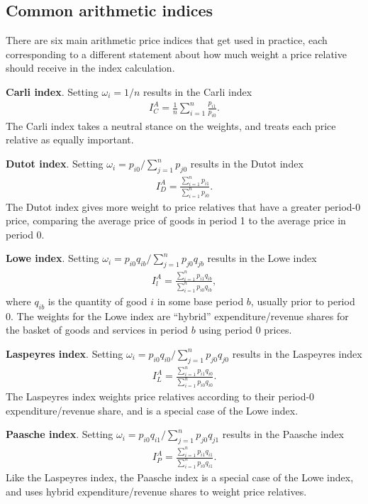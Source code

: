 \documentclass[]{article}
\begin{document}
\hypertarget{common-arithmetic-indices}{%
\subsection{Common arithmetic indices}\label{common-arithmetic-indices}}

There are six main arithmetic price indices that get used in practice, each corresponding to a different statement about how much weight a price relative should receive in the index calculation.

\textbf{Carli index}. Setting \(\omega_{i} = 1 / n\) results in the Carli index
\begin{align*}
I^{A}_{C} = \frac{1}{n} \sum_{i = 1}^{n} \frac{p_{i1}}{p_{i0}}.
\end{align*}
The Carli index takes a neutral stance on the weights, and treats each price relative as equally important.

\textbf{Dutot index}. Setting \(\omega_{i} = p_{i0} / \sum_{j = 1}^{n} p_{j0}\) results in the Dutot index
\begin{align*}
I^{A}_D = \frac{\sum_{i = 1}^{n} p_{i1}}{\sum_{i = 1}^{n} p_{i0}}.
\end{align*}
The Dutot index gives more weight to price relatives that have a greater period-0 price, comparing the average price of goods in period 1 to the average price in period 0.

\textbf{Lowe index}. Setting \(\omega_{i} = p_{i0} q_{ib} / \sum_{j = 1}^{n} p_{j0} q_{jb}\) results in the Lowe index
\begin{align*}
I^{A}_{l} = \frac{\sum_{i = 1}^{n} p_{i1} q_{ib}}{\sum_{i = 1}^{n} p_{i0} q_{ib}},
\end{align*}
where \(q_{ib}\) is the quantity of good \(i\) in some base period \(b\), usually prior to period 0. The weights for the Lowe index are ``hybrid'' expenditure/revenue shares for the basket of goods and services in period \(b\) using period 0 prices.

\textbf{Laspeyres index}. Setting \(\omega_{i} = p_{i0} q_{i0} / \sum_{j = 1}^{n} p_{j0} q_{j0}\) results in the Laspeyres index
\begin{align*}
I^{A}_{L} = \frac{\sum_{i = 1}^{n} p_{i1} q_{i0}}{\sum_{i = 1}^{n} p_{i0} q_{i0}}.
\end{align*}
The Laspeyres index weights price relatives according to their period-0 expenditure/revenue share, and is a special case of the Lowe index.

\textbf{Paasche index}. Setting \(\omega_{i} = p_{i0} q_{i1} / \sum_{j = 1}^{n} p_{j0} q_{j1}\) results in the Paasche index
\begin{align*}
I^{A}_{P} = \frac{\sum_{i = 1}^{n} p_{i1} q_{i1}}{\sum_{i = 1}^{n} p_{i0} q_{i1}}.
\end{align*}
Like the Laspeyres index, the Paasche index is a special case of the Lowe index, and uses hybrid expenditure/revenue shares to weight price relatives.
\end{document}

